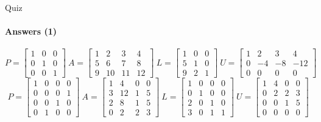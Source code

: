 \documentclass[aspectratio=169]{beamer}
\begin{document}
\begin{frame}[t]{Quiz}
\framesubtitle{Answers (1)}
\setcounter{equation}{0}
\begin{equation}
    P=\begin{bmatrix}
    1 & 0 & 0 \\
    0 & 1 & 0 \\ 
    0 & 0  & 1 
    \end{bmatrix}\ A=\begin{bmatrix}
        1 & 2  & 3  & 4  \\
        5 & 6  & 7  & 8  \\
        9 & 10 & 11 & 12
    \end{bmatrix}\ L=\begin{bmatrix}
    1 & 0 & 0 \\
    5 & 1 & 0 \\ 
    9 & 2  & 1 
    \end{bmatrix}\ U=\begin{bmatrix}
    1 & 2 & 3 & 4\\
    0 & -4 & -8 & -12\\ 
    0 & 0  & 0 & 0 
    \end{bmatrix}
\end{equation}
\begin{equation}
    P=\begin{bmatrix}
    1 & 0 & 0 & 0 \\
    0 & 0 & 0 & 1\\ 
    0 & 0  & 1 & 0 \\
    0 & 1 & 0 & 0 
    \end{bmatrix}\ A=\begin{bmatrix}
        1 & 4  & 0 & 0 \\
        3 & 12 & 1 & 5 \\
        2 & 8  & 1 & 5 \\
        0 & 2  & 2 & 3
    \end{bmatrix}\ L=\begin{bmatrix}
    1 & 0 & 0 & 0 \\
    0 & 1 & 0 & 0\\ 
    2 & 0  & 1 & 0 \\ 
    3 & 0 & 1 & 1 
    \end{bmatrix}\ U=\begin{bmatrix}
    1 & 4 & 0 & 0\\
    0 & 2 & 2 & 3\\ 
    0 & 0 & 1 & 5\\
    0 & 0 & 0 & 0 
    \end{bmatrix}
\end{equation}
\end{frame}
\end{document}
